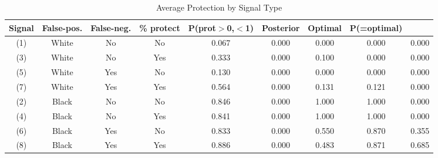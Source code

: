 \begin{table}[H]\centering \footnotesize \caption{Average Protection by Signal Type} \begin{tabular}{cccccccc} \hline \hline
\textbf{Signal}&\textbf{False-pos.}&\textbf{False-neg.}&\textbf{\% protect}& \textbf{P(prot$>$0,$<$1)}& \textbf{Posterior} & \textbf{Optimal} & \textbf{P(=optimal)} \\ \hline
(1)&White&No&No&0.067&0.000&0.000&0.000&0.000\\
(3)&White&No&Yes&0.333&0.000&0.100&0.000&0.000\\
(5)&White&Yes&No&0.130&0.000&0.000&0.000&0.000\\
(7)&White&Yes&Yes&0.564&0.000&0.131&0.121&0.000\\
(2)&Black&No&No&0.846&0.000&1.000&1.000&0.000\\
(4)&Black&No&Yes&0.841&0.000&1.000&1.000&0.000\\
(6)&Black&Yes&No&0.833&0.000&0.550&0.870&0.355\\
(8)&Black&Yes&Yes&0.886&0.000&0.483&0.871&0.685\\
\hline \end{tabular} \end{table}
